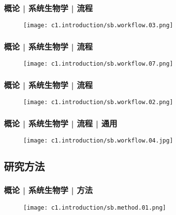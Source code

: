 \begin{frame}
  \frametitle{概论 | 系统生物学 | 流程}
  \begin{figure}
    \centering
    \texttt{[image: c1.introduction/sb.workflow.03.png]}
  \end{figure}
\end{frame}

\begin{frame}
  \frametitle{概论 | 系统生物学 | 流程}
  \begin{figure}
    \centering
    \texttt{[image: c1.introduction/sb.workflow.07.png]}
  \end{figure}
\end{frame}

\begin{frame}
  \frametitle{概论 | 系统生物学 | 流程}
  \begin{figure}
    \centering
    \texttt{[image: c1.introduction/sb.workflow.02.png]}
  \end{figure}
\end{frame}

\begin{frame}
  \frametitle{概论 | 系统生物学 | 流程 | 通用}
  \begin{figure}
    \centering
    \texttt{[image: c1.introduction/sb.workflow.04.jpg]}
  \end{figure}
\end{frame}

%

\subsection{研究方法}
\begin{frame}
  \frametitle{概论 | 系统生物学 | 方法}
  \begin{figure}
    \centering
    \texttt{[image: c1.introduction/sb.method.01.png]}
  \end{figure}
\end{frame}

